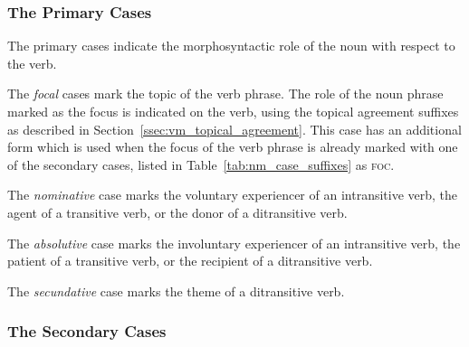 \documentclass[grammar]{subfiles}
\begin{document}
  \subsubsection{The Primary Cases}
  \label{sssec:nm_primary_cases}

  The primary cases indicate the morphosyntactic role of the noun with respect to the verb.

  \label{nm_focal_case}

  The \emph{focal} cases mark the topic of the verb phrase.  The role of the
  noun phrase marked as the focus is indicated on the verb, using the topical
  agreement suffixes as described in Section~\ref{ssec:vm_topical_agreement}.
  This case has an additional form which is used when the focus of the verb
  phrase is already marked with one of the secondary cases, listed in
  Table~\ref{tab:nm_case_suffixes} as \textsc{foc}.

  \label{nm_nominative_case}

  The \emph{nominative} case marks the voluntary experiencer of an intransitive
  verb, the agent of a transitive verb, or the donor of a ditransitive verb.

  \label{nm_absolutive_case}

  The \emph{absolutive} case marks the involuntary experiencer of an
  intransitive verb, the patient of a transitive verb, or the recipient of a
  ditransitive verb.

  \label{nm_secundative_case}

  The \emph{secundative} case marks the theme of a ditransitive verb.

  \subsubsection{The Secondary Cases}
  \label{sssec:nm_secondary_cases}
\end{document}
